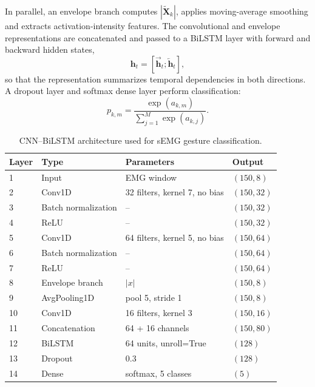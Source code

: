 \documentclass[technologies,article,submit,pdftex,moreauthors]{Definitions/mdpi}
\begin{document}
In parallel, an envelope branch computes $|\tilde{\mathbf{X}}_k|$, applies moving-average smoothing and extracts activation-intensity features. The convolutional and envelope representations are concatenated and passed to a BiLSTM layer with forward and backward hidden states,
\begin{equation}
    \label{eq:bilstm-state}
    \mathbf{h}_{t}
    =
    \left[
    \overrightarrow{\mathbf{h}}_{t};
    \overleftarrow{\mathbf{h}}_{t}
    \right],
\end{equation}
so that the representation summarizes temporal dependencies in both directions. A dropout layer and softmax dense layer perform classification:
\begin{equation}
    \label{eq:softmax}
    p_{k,m}
    =
    \frac{\exp(a_{k,m})}
    {\sum_{j=1}^{M}\exp(a_{k,j})}.
\end{equation}

\begin{table}[H]
\centering
\caption{CNN--BiLSTM architecture used for sEMG gesture classification.\label{tab:architecture}}
\begin{tabular}{llll}
\toprule
\textbf{Layer} & \textbf{Type} & \textbf{Parameters} & \textbf{Output} \\
\midrule
1 & Input & EMG window & $(150, 8)$ \\
2 & Conv1D & 32 filters, kernel 7, no bias & $(150, 32)$ \\
3 & Batch normalization & -- & $(150, 32)$ \\
4 & ReLU & -- & $(150, 32)$ \\
5 & Conv1D & 64 filters, kernel 5, no bias & $(150, 64)$ \\
6 & Batch normalization & -- & $(150, 64)$ \\
7 & ReLU & -- & $(150, 64)$ \\
8 & Envelope branch & $|x|$ & $(150, 8)$ \\
9 & AvgPooling1D & pool 5, stride 1 & $(150, 8)$ \\
10 & Conv1D & 16 filters, kernel 3 & $(150, 16)$ \\
11 & Concatenation & 64 + 16 channels & $(150, 80)$ \\
12 & BiLSTM & 64 units, unroll=True & $(128)$ \\
13 & Dropout & 0.3 & $(128)$ \\
14 & Dense & softmax, 5 classes & $(5)$ \\
\bottomrule
\end{tabular}
\end{table}
\end{document}
